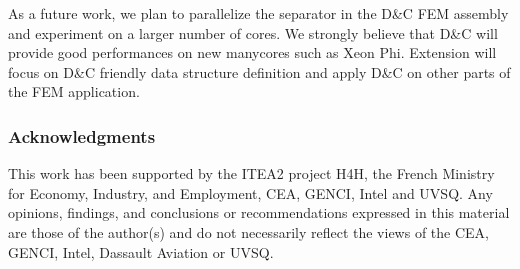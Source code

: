 \documentclass{IOS-Book-Article}
\begin{document}
As a future work, we plan to parallelize the separator in the D\&C FEM assembly and experiment on a larger number of cores.
We strongly believe that D\&C will provide good performances on new manycores such as Xeon Phi.
Extension will focus on D\&C friendly data structure definition and apply D\&C on other parts of the FEM application. 

\subsubsection*{Acknowledgments} \scriptsize{
This work has been supported by the ITEA2 project H4H, the French Ministry for Economy,
Industry, and Employment, CEA, GENCI, Intel and UVSQ.  Any opinions,
findings, and conclusions or recommendations expressed in this
material are those of the author(s) and do not necessarily reflect the
views of the CEA, GENCI, Intel, Dassault Aviation or UVSQ.}



\end{document}
